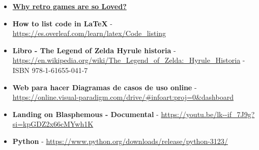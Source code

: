 \documentclass[a4paper]{article}
\begin{document}
\begin{itemize}
    \item \textbf{\href{https://www.wired.com/story/why-retro-looking-games-get-so-much-love/}{Why retro games are so Loved?}}
    \item \textbf{How to list code in LaTeX} - \url{https://es.overleaf.com/learn/latex/Code_listing}
    \item \textbf{Libro - The Legend of Zelda Hyrule historia} - \url{https://en.wikipedia.org/wiki/The_Legend_of_Zelda:_Hyrule_Historia} - ISBN 978-1-61655-041-7
    \item \textbf{Web para hacer Diagramas de casos de uso online} - \url{https://online.visual-paradigm.com/drive/#infoart:proj=0&dashboard}
    \item \textbf{Landing on Blasphemous - Documental} - \url{https://youtu.be/lk--if_7J9g?si=kpGDZ2x66cMYwh1K}
    \item \textbf{Python} - \url{https://www.python.org/downloads/release/python-3123/}
\end{itemize}

\clearpage
\end{document}
